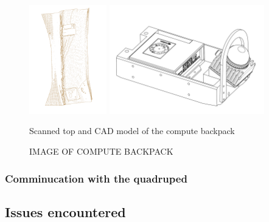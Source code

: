 \documentclass[11pt]{article}
\begin{document}
        \begin{figure}[H]
            \centering
            \includegraphics[width=0.3\textwidth]{Images/ScanGO2Top.pdf}
            \includegraphics[width=0.6\textwidth]{Images/ComputeBackpack.pdf}
            \caption{Scanned top and CAD model of the compute backpack }
            \label{fig:scanner_and_cad}
        \end{figure}




        \begin{figure}[H]
            \centering
            IMAGE OF COMPUTE BACKPACK
        \end{figure}


        
        \subsubsection{Comminucation with the quadruped}

        
    \subsection{Issues encountered}
        
\end{document}
